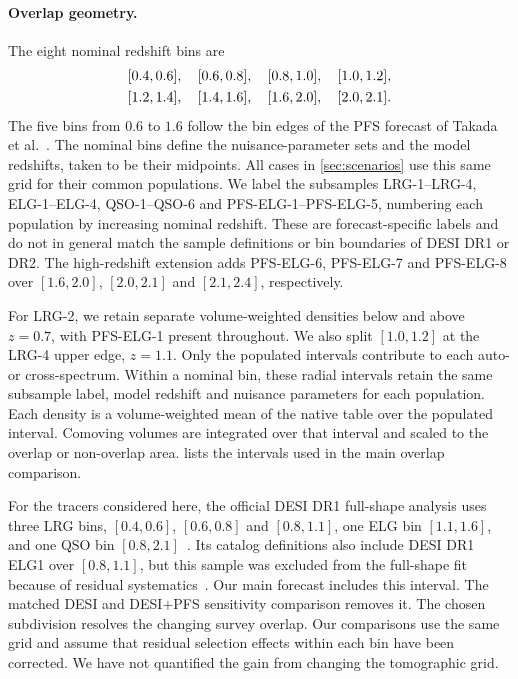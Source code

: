 \documentclass[a4paper,11pt]{article}
\newcommand{\revchange}[1]{{\color{RevisionColor}#1}}
\begin{document}
\paragraph{Overlap geometry.}\leavevmode%
\revchange{The eight nominal redshift bins are
\[
\begin{gathered}\relax
[0.4,0.6],\quad [0.6,0.8],\quad [0.8,1.0],\quad [1.0,1.2],\\
[1.2,1.4],\quad [1.4,1.6],\quad [1.6,2.0],\quad [2.0,2.1].
\end{gathered}
\]
The five bins from $0.6$ to $1.6$ follow the bin edges
of the PFS forecast of Takada et al.~\cite{Takada:2014pfs}.
The nominal bins define the nuisance-parameter sets and the
model redshifts, taken to be their midpoints. All cases in \cref{sec:scenarios} use this same grid for their common
populations. We label the subsamples LRG-1--LRG-4, ELG-1--ELG-4,
QSO-1--QSO-6 and PFS-ELG-1--PFS-ELG-5, numbering each population
by increasing nominal redshift. These are forecast-specific labels
and do not in general match the sample definitions or bin boundaries
of DESI DR1 or DR2. The high-redshift extension adds PFS-ELG-6,
PFS-ELG-7 and PFS-ELG-8 over $[1.6,2.0]$, $[2.0,2.1]$ and
$[2.1,2.4]$, respectively.

For LRG-2, we retain separate volume-weighted densities below
and above $z=0.7$, with PFS-ELG-1 present throughout.
We also split $[1.0,1.2]$ at the LRG-4 upper edge, $z=1.1$.
Only the populated intervals contribute
to each auto- or cross-spectrum. Within a nominal bin, these
radial intervals retain the same subsample label, model redshift
and nuisance parameters for each population. Each density is a volume-weighted mean
of the native table over the populated interval. Comoving
volumes are integrated over that interval and scaled to the
overlap or non-overlap area. \Cref{tab:surveys} lists the
intervals used in the main overlap comparison.

For the tracers considered here, the official DESI DR1
full-shape analysis uses three LRG bins, $[0.4,0.6]$,
$[0.6,0.8]$ and $[0.8,1.1]$, one ELG bin
$[1.1,1.6]$, and one QSO bin
$[0.8,2.1]$~\cite{DESI:2024hhd}. Its catalog definitions
also include DESI DR1 ELG1 over $[0.8,1.1]$, but this sample was
excluded from the full-shape fit because of residual
systematics~\cite{DESI:2024jxi}. Our main forecast includes
this interval. The matched DESI and DESI+PFS sensitivity
comparison removes it. The chosen subdivision resolves the changing survey overlap. Our comparisons
use the same grid and assume that residual selection effects within each bin
have been corrected. We have not quantified the gain from changing the
tomographic grid.}
\end{document}
